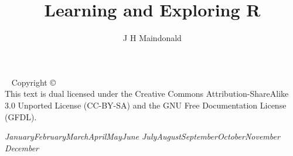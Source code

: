 \documentclass{tufte-book}\usepackage[]{graphicx}\usepackage[]{color}
\title{Learning and Exploring R}
\author[]{J H Maindonald}
\newcommand{\monthyear}{%
  \ifcase\month\or January\or February\or March\or April\or May\or June\or
  July\or August\or September\or October\or November\or
  December\fi\space\number\year
}
\newcommand{\blankpage}{\newpage\hbox{}\thispagestyle{empty}\newpage}
\begin{document}

\frontmatter




%

\setsidenotefont{\small}
\setcaptionfont{\small}
\setmarginnotefont{\small}

\BgThispage
\bmdefine{}
\bmdefine{}
\bmdefine{}


\maketitle

\newpage
\begin{fullwidth}
~\vfill
\thispagestyle{empty}
\setlength{\parindent}{0pt}
\setlength{\parskip}{\baselineskip}
Copyright \copyright\ \the\year\ \thanklessauthor\\
This text is dual licensed under the Creative Commons Attribution-ShareAlike 3.0 Unported License (CC-BY-SA) and the GNU Free Documentation License (GFDL). 



\par\textit{\monthyear}
\end{fullwidth}
\vfill
\end{document}
